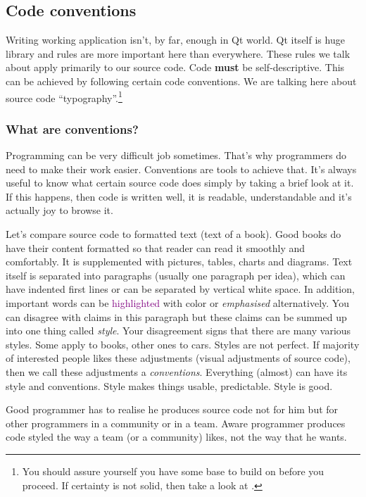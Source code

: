 \subsection{Code conventions}
Writing working application isn't, by far, enough in Qt world. Qt itself is huge library and rules are more important here than everywhere. These rules we talk about apply primarily to our source code. Code \textbf{must} be self-descriptive. This can be achieved by following certain code conventions. We are talking here about source code \enquote{typography}.\footnote{You should assure yourself you have some base to build on before you proceed. If certainty is not solid, then take a look at \citep[p.~40-77]{mcconnell:codecomplete}.}

\subsubsection{What are conventions?}
Programming can be very difficult job sometimes. That's why programmers do need to make their work easier. Conventions are tools to achieve that. It's always useful to know what certain source code does simply by taking a brief look at it. If this happens, then code is written well, it is readable, understandable and it's actually joy to browse it.

Let's compare source code to formatted text (\eg  text of a book). Good books do have their content formatted so that reader can read it smoothly and comfortably. It is supplemented with pictures, tables, charts and diagrams. Text itself is separated into paragraphs (usually one paragraph per idea), which can have indented first lines or can be separated by vertical white space. In addition, important words can be \textcolor{purple}{highlighted} with color or \emph{emphasised} alternatively. You can disagree with claims in this paragraph but these claims can be summed up into one thing called \emph{style}. Your disagreement signs that there are many various styles. Some apply to books, other ones to cars. Styles are not perfect. If majority of interested people likes these adjustments (\eg visual adjustments of source code), then we call these adjustments a \emph{conventions}. Everything (almost) can have its style and conventions. Style makes things usable, predictable. Style 
is good.

Good programmer has to realise he produces source code not for him but for other programmers in a community or in a team. Aware programmer produces code styled the way a team (or a community) likes, not the way that he wants.

